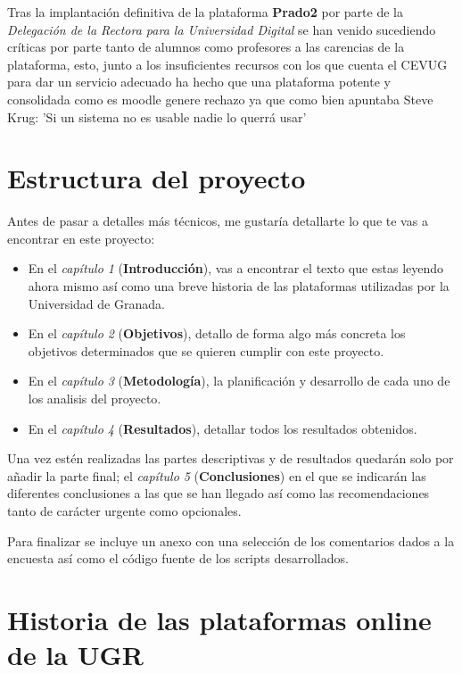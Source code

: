 \bigskip
Tras la implantación definitiva de la plataforma \textbf{Prado2} por parte de la \textit{Delegación de la Rectora para la Universidad Digital} se han venido sucediendo críticas por parte tanto de alumnos como profesores a las carencias de la plataforma, esto, junto a los insuficientes recursos con los que cuenta el CEVUG para dar un servicio adecuado ha hecho que una plataforma potente y consolidada como es moodle genere rechazo ya que como bien apuntaba Steve Krug: 'Si un sistema no es usable nadie lo querrá usar' \cite{stevekrug}


\section{Estructura del proyecto}


\bigskip
Antes de pasar a detalles más técnicos, me gustaría detallarte lo que te vas a encontrar en este proyecto:

\begin{itemize}
  \item En el \textit{capítulo 1} (\textbf{Introducción}), vas a encontrar el texto que estas leyendo ahora mismo así como una breve historia de las plataformas utilizadas por la Universidad de Granada.
  \item En el \textit{capítulo 2} (\textbf{Objetivos}), detallo de forma algo más concreta los objetivos determinados que se quieren cumplir con este proyecto.
  \item En el \textit{capítulo 3} (\textbf{Metodología}), la planificación y desarrollo de cada uno de los analisis del proyecto.
  \item En el \textit{capítulo 4} (\textbf{Resultados}), detallar todos los resultados obtenidos.
\end{itemize}

\bigskip
Una vez estén realizadas las partes descriptivas y de resultados quedarán solo por añadir la parte final; el \textit{capítulo 5} (\textbf{Conclusiones}) en el que se indicarán las diferentes conclusiones a las que se han llegado así como las recomendaciones tanto de carácter urgente como opcionales.

\bigskip
Para finalizar se incluye un anexo con una selección de los comentarios dados a la encuesta así como el código fuente de los scripts desarrollados.

\section{Historia de las plataformas online de la UGR}

